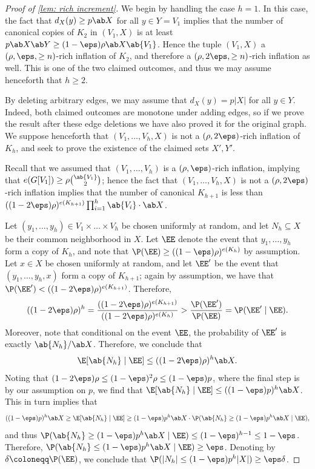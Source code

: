 \begin{proof}[Proof of \cref{lem: rich increment}]


    We begin by handling the case $h=1$. In this case, the fact that $d_X(y) \geq p \ab X$ for all $y \in Y=V_1$ implies that the number of canonical copies of $K_2$ in $(V_1,X)$ is at least $p \ab X \ab Y \geq (1-\eps)\rho \ab X \ab {V_1}$. Hence the tuple $(V_1,X)$ a $(\rho,\eps,\geq n)$-rich inflation of $K_2$, and therefore a $(\rho,2\eps,\geq n)$-rich inflation as well. This is one of the two claimed outcomes, and thus we may assume henceforth that $h \geq 2$.

By deleting arbitrary edges, we may assume that $d_X(y) = p|X|$ for all $y \in Y$. Indeed, both claimed outcomes are monotone under adding edges, so if we prove the result after these edge deletions we have also proved it for the original graph. 
We suppose henceforth that $(V_1,\dots,V_h,X)$ is not a $(\rho,2\eps)$-rich inflation of $K_h$, and seek to prove the existence of the claimed sets $X',Y'$.
    
Recall that we assumed that $(V_1,\dots,V_h)$ is a $(\rho,\eps)$-rich inflation, implying that $e(G[V_1]) \geq \rho \binom{\ab{V_1}}2$; hence the fact that $(V_1,\dots,V_h,X)$ is not a $(\rho,2\eps)$-rich inflation implies that the number of canonical $K_{h+1}$ is less than $((1-2\eps)\rho)^{e(K_{h+1})} \prod_{i=1}^h \ab{V_i}\cdot \ab X$.


Let $(y_1,\dots,y_h)\in V_1\times \dots \times V_h$ be chosen uniformly at random, and let $N_h \subseteq X$ be their common neighborhood in $X$.
Let $\EE$ denote the event that $y_1,\dots,y_h$ form a copy of $K_h$, and note that $\P(\EE) \geq ((1-\eps)\rho)^{e(K_h)}$ by assumption. 
Let $x \in X$ be chosen uniformly at random, and let $\EE'$ be the event that $(y_1,\dots,y_h,x)$ form a copy of $K_{h+1}$; again by assumption, we have that $\P(\EE')<((1-2\eps)\rho)^{e(K_{h+1})}$. Therefore,
\[
((1-2\eps)\rho)^h = \frac{((1-2\eps)\rho)^{e(K_{h+1})}}{((1-2\eps)\rho)^{e(K_h)}} > \frac{\P(\EE')}{\P(\EE)} = \P(\EE' \mid \EE).
\]
Moreover, note that conditional on the event $\EE$, the probability of $\EE'$ is exactly $\ab{N_h}/\ab X$. Therefore, we conclude that
\[
\E[\ab{N_h} \mid \EE] \leq ((1-2\eps)\rho)^{h}\ab X.
\]
Noting that $(1-2\eps)\rho \leq (1-\eps)^2\rho \leq (1-\eps)p$, where the final step is by our assumption on $p$, we find that $\E[\ab{N_h} \mid \EE] \leq ((1-\eps)p)^h \ab X$. This in turn implies that
\[
((1-\eps)p)^h \ab X \geq \E[\ab{N_h} \mid \EE] \geq (1-\eps)p^h \ab X\cdot \P(\ab{N_h} \geq (1-\eps)p^h \ab X\mid \EE),
\]
and thus $\P(\ab{N_h} \geq (1-\eps)p^h \ab X \mid \EE) \leq (1-\eps)^{h-1} \leq 1-\eps$. Therefore, $\P(\ab{N_h} \leq (1-\eps)p^h \ab X \mid \EE) \geq \eps$. Denoting by $\delta \coloneqq \P(\EE)$, we conclude that
$\P(|N_h|\leq (1-\eps)p^h|X|)\ge \eps \delta$. 


\end{proof}
